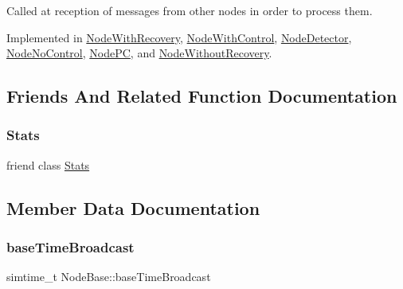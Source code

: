 Called at reception of messages from other nodes in order to process them. 



Implemented in \hyperlink{class_node_with_recovery_a216c29d76ddb0e94cd5701ff208c7f5b}{Node\+With\+Recovery}, \hyperlink{class_node_with_control_af532082fab76c38d8c50ca90e991f4c3}{Node\+With\+Control}, \hyperlink{class_node_detector_ab69432c6d3327a684845ec231826727e}{Node\+Detector}, \hyperlink{class_node_no_control_aa83bc408fe3dab03f124ea5489946836}{Node\+No\+Control}, \hyperlink{class_node_p_c_aa5fedc4136104a06e2f1131f1ba16b0e}{Node\+PC}, and \hyperlink{class_node_without_recovery_a0b44132b4ebc650399711766cb050399}{Node\+Without\+Recovery}.



\subsection{Friends And Related Function Documentation}
\mbox{\label{class_node_base_a129f65b6976377739eb6231b6962985e}} 
\subsubsection{\texorpdfstring{Stats}{Stats}}
{\footnotesize\ttfamily friend class \hyperlink{class_stats}{Stats}\hspace{0.3cm}{\ttfamily [friend]}}



\subsection{Member Data Documentation}
\mbox{\label{class_node_base_a199676fc8bd0203c7241f58779c5921c}} 
\subsubsection{\texorpdfstring{base\+Time\+Broadcast}{baseTimeBroadcast}}
{\footnotesize\ttfamily simtime\+\_\+t Node\+Base\+::base\+Time\+Broadcast\hspace{0.3cm}{\ttfamily [protected]}}



